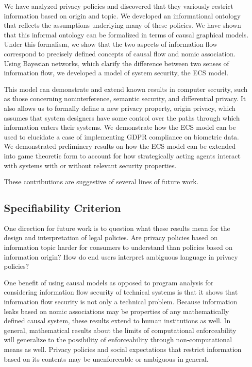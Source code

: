\documentclass[../thesis.tex]{subfiles}
\begin{document}
We have analyzed privacy policies and discovered
that they variously restrict information based on
origin and topic.
We developed an informational ontology that reflects
the assumptions underlying many of these policies.
We have shown that this informal ontology can
be formalized in terms of causal graphical models.
Under this formalism, we show that the two aspects
of information flow correspond to precisely defined
concepts of causal flow and nomic association.
Using Bayesian networks, which clarify the difference between
two senses of information flow, we developed a model
of system security, the ECS model.

This model can
demonstrate and extend known results in computer security,
such as those concerning noninterference, semantic security,
and differential privacy.
It also allows us to formally define a new privacy property,
origin privacy, which assumes that system designers have
some control over the paths through which information enters
their systems.
We demonstrate how the ECS model can be used to elucidate
a case of implementing GDPR compliance on biometric data.
We demonstrated preliminery results on how the ECS model
can be extended into game theoretic form to account for
how strategically acting agents interact with systems
with or without relevant security properties.

These contributions are suggestive of several lines
of future work.

\subsection{Specifiability Criterion}

One direction for future work is to question what
these results mean for the design and interpretation
of legal policies.
Are privacy policies based on information topic harder
for consumers to understand than policies based on
information origin?
How do end users interpret ambiguous language in privacy
policies?

One benefit of using causal models as opposed to
program analysis for considering information flow
security of technical systems is that it shows
that information flow security is not only
a technical problem.
Because information leaks based on nomic associations
may be properties of any mathematically defined causal
system, these results extend to human institutions
as well.
In general, mathematical results about the limits
of computational enforceability will generalize
to the possibility of enforceability through
non-computational means as well.
Privacy policies and social expectations
that restrict information
based on its contents may be unenforceable or ambiguous
in general.
\end{document}
